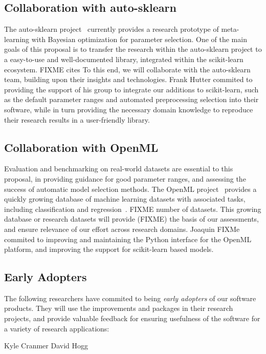 \subsection{Collaboration with auto-sklearn}
The auto-sklearn project~\cite{feurer-nips2015} currently provides a research
prototype of meta-learning with Bayesian optimization for parameter selection.
One of the main goals of this proposal is to transfer the research within the
auto-sklearn project to a easy-to-use and well-documented library, integrated
within the scikit-learn ecosystem. FIXME cites To this end, we will collaborate
with the auto-sklearn team, building upon their insights and technologies.
Frank Hutter commited to providing the support of his group to integrate our
additions to scikit-learn, such as the default parameter ranges and automated
preprocessing selection into their software, while in turn providing the
necessary domain knowledge to reproduce their research results in a
user-friendly library.

\subsection{Collaboration with OpenML}
Evaluation and benchmarking on real-world datasets are essential to this proposal, in providing
guidance for good parameter ranges, and assessing the success of automatic model selection methods.
The OpenML project~\cite{van2013openml} provides a quickly growing database of machine learning datasets with associated
tasks, including classification and regression~\cite{vanschoren2014openml}. FIXME number of datasets.
This growing database or research datasets will provide (FIXME) the basis of our assessments, and
ensure relevance of our effort across research domains.
Joaquin FIXMe commited to improving and maintaining the Python interface for the OpenML platform,
and improving the support for scikit-learn based models.

\subsection{Early Adopters}
The following researchers have commited to being \emph{early adopters} of our software
products. They will use the improvements and packages in their research projects,
and provide valuable feedback for ensuring usefulness of the software for a
variety of research applications:

Kyle Cranmer
David Hogg

